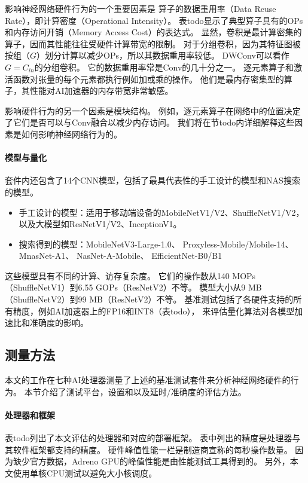 影响神经网络硬件行为的一个重要因素是
算子的数据重用率（Data Reuse Rate），即计算密度（Operational Intensity）。
表todo显示了典型算子具有的OPs和内存访问开销（Memory Access Cost）的表达式。
显然，卷积是最计算密集的算子，因而其性能往往受硬件计算带宽的限制。
对于分组卷积，因为其特征图被按组（$G$）划分计算以减少OPs，所以其数据重用率较低。
DWConv可以看作$G = C_{in}$的分组卷积。
它的数据重用率常是Conv的几十分之一。
逐元素算子和激活函数对张量的每个元素都执行例如加或乘的操作。
他们是最内存密集型的算子，其性能对AI加速器的内存带宽非常敏感。

影响硬件行为的另一个因素是模块结构。
例如，逐元素算子在网络中的位置决定了它们是否可以与Conv融合以减少内存访问。
我们将在节todo内详细解释这些因素是如何影响神经网络行为的。

\paragraph{模型与量化}
套件内还包含了14个CNN模型，包括了最具代表性的手工设计的模型和NAS搜索的模型。
\begin{itemize}
    \item 手工设计的模型：适用于移动端设备的MobileNetV1/V2、ShuffleNetV1/V2，
    以及大模型如ResNetV1/V2、InceptionV1\cite{szegedy2015going}。
    \item 搜索得到的模型：MobileNetV3-Large-1.0\cite{howard2019searching}、
    Proxyless-Mobile/Mobile-14\cite{cai2018proxylessnas}、
    MnasNet-A1\cite{tan2019mnasnet}、
    NasNet-A-Mobile\cite{zoph2018learning}、
    EfficientNet-B0/B1\cite{tan2019efficientnet}
\end{itemize}
这些模型具有不同的计算、访存复杂度。
它们的操作数从140 MOPs（ShuffleNetV1）到6.55 GOPs（ResNetV2）不等。
模型大小从9 MB（ShuffleNetV2）到99 MB（ResNetV2）不等。
基准测试包括了各硬件支持的所有精度，例如AI加速器上的FP16和INT8（表todo），
来评估量化算法对各模型加速比和准确度的影响。

\subsection{测量方法}
\label{measurement}
本文的工作在七种AI处理器测量了上述的基准测试套件来分析神经网络硬件的行为。
本节介绍了测试平台，设置和以及延时/准确度的评估方法。

\paragraph{处理器和框架}
表todo列出了本文评估的处理器和对应的部署框架。
表中列出的精度是处理器与其软件框架都支持的精度。
硬件峰值性能一栏是制造商宣称的每秒操作数量。
因为缺少官方数据，Adreno GPU的峰值性能是由性能测试工具\cite{clpeak}得到的。
另外，本文使用单核CPU测试以避免大小核调度。

